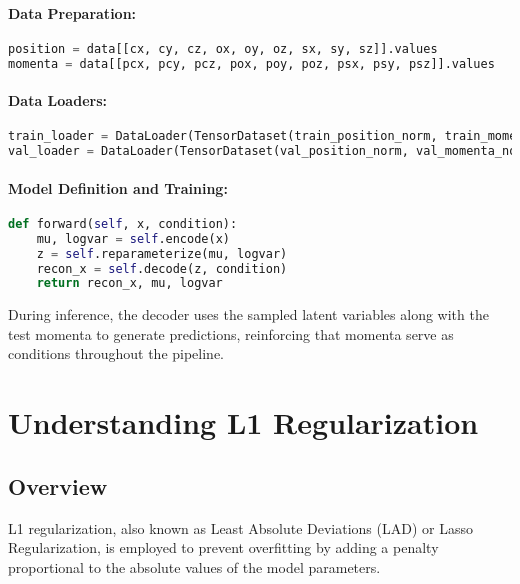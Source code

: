 \documentclass[10pt]{article}
\begin{document}
\paragraph{Data Preparation:}
\begin{lstlisting}[language=Python, caption=Data Preparation]
position = data[[cx, cy, cz, ox, oy, oz, sx, sy, sz]].values
momenta = data[[pcx, pcy, pcz, pox, poy, poz, psx, psy, psz]].values
\end{lstlisting}

\paragraph{Data Loaders:}
\begin{lstlisting}[language=Python, caption=Data Loaders Setup]
train_loader = DataLoader(TensorDataset(train_position_norm, train_momenta_norm), batch_size=BATCHSIZE, shuffle=True)
val_loader = DataLoader(TensorDataset(val_position_norm, val_momenta_norm), batch_size=BATCHSIZE, shuffle=False)
\end{lstlisting}

\paragraph{Model Definition and Training:}
\begin{lstlisting}[language=Python, caption=Model Forward Pass]
def forward(self, x, condition):
    mu, logvar = self.encode(x)
    z = self.reparameterize(mu, logvar)
    recon_x = self.decode(z, condition)
    return recon_x, mu, logvar
\end{lstlisting}

During inference, the decoder uses the sampled latent variables along with the test momenta to generate predictions, reinforcing that momenta serve as conditions throughout the pipeline.

\section{Understanding L1 Regularization}

\subsection{Overview}
L1 regularization, also known as Least Absolute Deviations (LAD) or Lasso Regularization, is employed to prevent overfitting by adding a penalty proportional to the absolute values of the model parameters.
\end{document}
